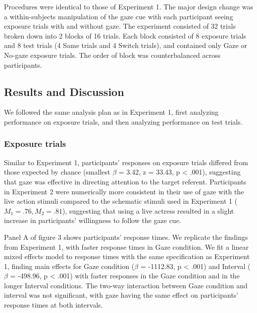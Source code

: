 \documentclass[authoryear, review]{elsarticle}
\begin{document}
Procedures were identical to those of Experiment 1. The major design
change was a within-subjects manipulation of the gaze cue with each
participant seeing exposure trials with and without gaze. The experiment
consisted of 32 trials broken down into 2 blocks of 16 trials. Each
block consisted of 8 exposure trials and 8 test trials (4 Same trials
and 4 Switch trials), and contained only Gaze or No-gaze exposure
trials. The order of block was counterbalanced across participants.

\subsection{Results and Discussion}\label{results-and-discussion-1}

We followed the same analysis plan as in Experiment 1, first analyzing
performance on exposure trials, and then analyzing performance on test
trials.

\subsubsection{Exposure trials}\label{exposure-trials-1}

Similar to Experiment 1, participants' responses on exposure trials
differed from those expected by chance (smallest \(\beta\) = 3.42, z =
33.43, p \textless{} .001), suggesting that gaze was effective in
directing attention to the target referent. Participants in Experiment 2
were numerically more consistent in their use of gaze with the live
action stimuli compared to the schematic stimuli used in Experiment 1
(\(M_1 = .76, M_2 = .81\)), suggesting that using a live actress
resulted in a slight increase in participants' willingness to follow the
gaze cue.

Panel A of figure 3 shows participants' response times. We replicate the
findings from Experiment 1, with faster response times in Gaze
condition. We fit a linear mixed effects model to response times with
the same specification as Experiment 1, finding main effects for Gaze
condition (\(\beta\) = -1112.83, p \textless{} .001) and Interval
(\(\beta\) = -498.96, p \textless{} .001) with faster responses in the
Gaze condition and in the longer Interval conditions. The two-way
interaction between Gaze condition and interval was not significant,
with gaze having the same effect on participants' response times at both
intervals.
\end{document}
